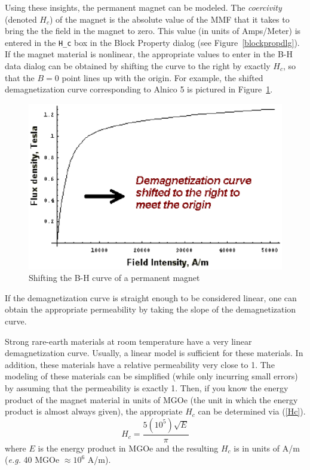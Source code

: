 \documentclass[12pt]{report}
\newcommand{\be}{\begin{equation}}
\newcommand{\ee}{\end{equation}}
\begin{document}
Using these insights, the permanent magnet can be modeled.  The
{\em coercivity} (denoted $H_c$) of the magnet is the absolute
value of the MMF that it takes to bring the the field in the magnet
to zero.  This value (in units of Amps/Meter) is entered in the
\verb+H_c+ box in the Block Property dialog (see
Figure~\ref{blockpropdlg}). If the magnet material is nonlinear,
the appropriate values to enter in the B-H data dialog can be
obtained by shifting the curve to the right by exactly $H_c$, so
that the $B=0$ point lines up with the origin.  For example, the
shifted demagnetization curve corresponding to Alnico 5 is pictured
in Figure~\ref{magshift}.
\begin{figure}
\centerline{\includegraphics{manfshft.ps}}
\caption{Shifting the B-H curve of a permanent magnet}
\label{magshift}
\end{figure}
If the demagnetization curve is straight enough to be considered
linear, one can obtain the appropriate permeability by taking the
slope of the demagnetization curve.

Strong rare-earth materials at room temperature have a very linear
demagnetization curve.  Usually, a linear model is sufficient for
these materials.  In addition, these materials have a relative
permeability very close to 1.  The modeling of these materials can
be simplified (while only incurring small errors) by assuming that
the permeability is exactly 1.  Then, if you know the energy
product of the magnet material in units of MGOe (the unit in which
the energy product is almost always given), the appropriate $H_c$
can be determined via (\ref{Hc}).
\be \label{Hc} H_c = \frac{5(10^5) \sqrt{E}}{\pi} \ee
where $E$ is the energy product in MGOe and the resulting $H_c$ is
in units of A/m ({\em e.g.} 40 MGOe $\approx 10^6$ A/m).
\end{document}
